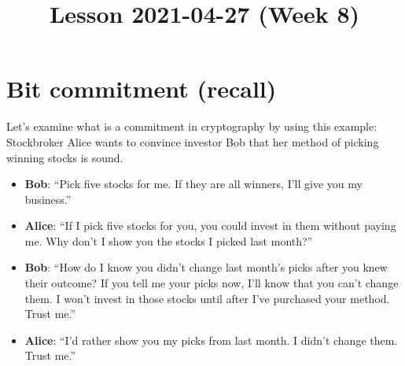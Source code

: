 \documentclass{article}
\title{Lesson 2021-04-27 (Week 8)}
\begin{document}
\date{}
\maketitle
\author{}
\date{}

\maketitle
\section{Bit commitment (recall)}
Let's examine what is a commitment in cryptography by using this example: \newline 
Stockbroker Alice wants to convince investor Bob that her method of picking winning stocks is sound.


\begin{itemize}
    \item \textbf{Bob}: “Pick five stocks for me. If they are all winners, I’ll give you my business.”
    \item \textbf{Alice}: “If I pick five stocks for you, you could invest in them
without paying me. Why don’t I show you the stocks I picked last
month?”
\item \textbf{Bob}: “How do I know you didn’t change last month’s picks after
you knew their outcome? If you tell me your picks now, I’ll know
that you can’t change them. I won’t invest in those stocks until
after I’ve purchased your method. Trust me.”
\item \textbf{Alice}: “I’d rather show you my picks from last month. I didn’t
change them. Trust me.”
\end{itemize}
\end{document}
